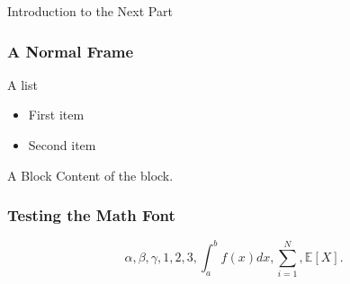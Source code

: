 \documentclass{beamer}
\begin{document}
\appendix


\begin{chapterframe}
\Large Introduction to the Next Part
\end{chapterframe}

\begin{frame} \frametitle{A Normal Frame}
A list
\begin{itemize}
\item First item
\item Second item
\end{itemize}

\begin{block}{A Block}
Content of the block.
\end{block}
\end{frame}



\begin{frame} \frametitle{Testing the Math Font}
\begin{equation*}
\alpha, \beta, \gamma, 1, 2, 3, \int_a^b f(x)dx, \sum_{i=1}^N, \mathbb{E}[X].
\end{equation*}
\end{frame}
\end{document}
